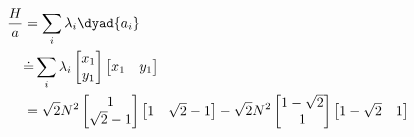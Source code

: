 \begin{answer}
  \begin{equation}
    \begin{split}
      \frac H a &= \sum_i \lambda_i \dyad{a_i}\\
      &\dot{=}\sum_i \lambda_i \begin{bmatrix}x_1\\y_1\\\end{bmatrix}\begin{bmatrix}x_1&y_1\\\end{bmatrix}\\
          &=
          \sqrt{2}N^2
          \begin{bmatrix}1\\\sqrt{2} - 1\\\end{bmatrix}\begin{bmatrix}1&\sqrt{2} - 1\\\end{bmatrix}
              - \sqrt{2}N^2
              \begin{bmatrix}1 - \sqrt{2}\\1\\\end{bmatrix}\begin{bmatrix}1 - \sqrt{2}&1\\\end{bmatrix}
    \end{split}
  \end{equation}

\end{answer}
